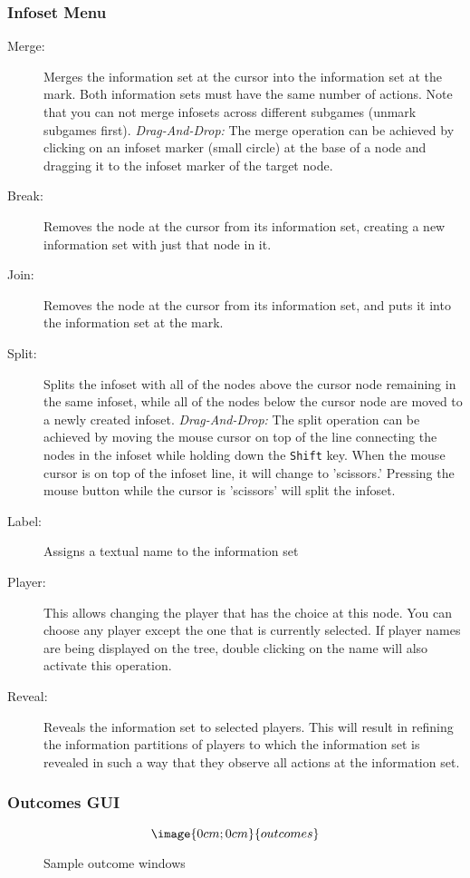 \subsubsection{Infoset Menu}
\begin{description}
\item[Merge:] Merges the information set at the cursor into the information set at 
the mark.  Both information sets must have the same number of actions.  Note
that you can not merge infosets across different subgames (unmark subgames first).
{\em Drag-And-Drop:} The merge operation can be achieved by clicking on an
infoset marker (small circle) at the base of a node and dragging it to the
infoset marker of the target node.  
\item[Break:] Removes the node at the cursor from its information set, creating a new 
information set with just that node in it. 
\item[Join:] Removes the node at the cursor from its information set, and puts it into 
the information set at the mark.  
\item[Split:] Splits the infoset with all of the nodes above the cursor node
remaining in the same infoset, while all of the nodes below the cursor node
are moved to a newly created infoset.
{\em Drag-And-Drop:} The split operation can be achieved by moving the mouse
cursor on top of the line connecting the nodes in the infoset while holding
down the {\tt Shift} key.  When the mouse cursor is on top of the infoset
line, it will change to 'scissors.'  Pressing the mouse button while the cursor
is 'scissors' will split the infoset.
\item[Label:] Assigns a textual name to the information set
\item[Player:]  This allows changing the player that has the choice
at this node.  You can choose any player except the one that is currently
selected.  If player names are being displayed on the tree, double clicking
on the name will also activate this operation.
\item[Reveal:] Reveals the information set to selected players.  This will 
result in refining the information partitions of players to which the information set 
is revealed in such a way that they observe all actions at the information set.  
\end{description}

\subsubsection{Outcomes GUI}
\begin{figure}
$$\image{0cm;0cm}{outcomes}$$
\caption{Sample outcome windows}\label{fig_outcomes}
\end{figure}

